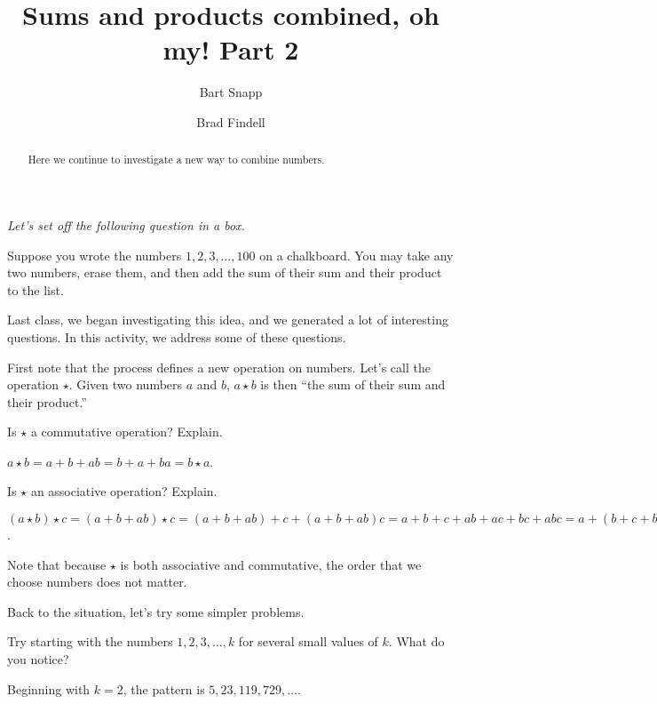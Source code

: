 \documentclass{ximera}
\title{Sums and products combined, oh my!  Part 2}
\author{Bart Snapp \and Brad Findell}
\begin{document}
\begin{abstract}
Here we continue to investigate a new way to combine numbers.
\end{abstract}
\maketitle

\emph{Let's set off the following question in a box.} 

Suppose you wrote the numbers $1,2,3,\dots,100$ on a chalkboard. You
may take any two numbers, erase them, and then add the sum of their
sum and their product to the list.

Last class, we began investigating this idea, and we generated a lot of interesting questions.  
In this activity, we address some of these questions.  



First note that the process defines a new operation on numbers.  Let's call the operation $\star$.  Given two numbers $a$ and $b$,  $a\star b$ is then ``the sum of their sum and their product.''    

\begin{problem}
Is $\star$ a commutative operation?  Explain.  
\begin{freeResponse}
$a\star b = a+b+ab= b+a+ba = b\star a$.  
\end{freeResponse}
\vfill
\end{problem}

\begin{problem}
Is $\star$ an associative operation?  Explain.  
\begin{freeResponse}
$(a\star b)\star c = (a+b+ab)\star c = (a+b+ab)+c + (a+b+ab)c 
= a + b + c + ab + ac + bc + abc = a+(b+c+bc) + a(b+c+bc) =
a\star (b+c+bc) = a \star(b\star c)$.  

Note that because $\star$ is both associative 
and commutative, the order that we choose numbers does not matter.  
\end{freeResponse}
\vfill
\end{problem}

\newpage
Back to the situation, let's try some simpler problems.  

\begin{problem}
Try starting with the numbers $1,2,3,\dots, k$ for several small values of $k$.  What do you notice?  
\begin{freeResponse}
Beginning with $k = 2$, the pattern is $5, 23, 119, 729, \dots$.  
\end{freeResponse}
\vfill
\end{problem}
\end{document}
